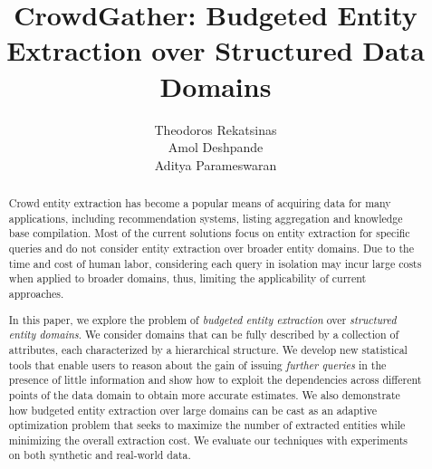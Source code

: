 \documentclass{vldb}
\begin{document}

\title{CrowdGather: Budgeted Entity Extraction over Structured Data Domains}


\author{
	\alignauthor Theodoros Rekatsinas\\
            \alignauthor Amol Deshpande\\
            \alignauthor Aditya Parameswaran \\
}

\maketitle

\begin{abstract}
Crowd entity extraction has become a popular means of acquiring data for many applications, including recommendation systems, listing aggregation and knowledge base compilation.  Most of the current solutions focus on entity extraction for specific queries and do not consider entity extraction over broader entity domains. Due to the time and cost of human labor, considering each query in isolation may incur large costs when applied to broader domains, thus, limiting the applicability of current approaches.
 
In this paper, we explore the problem of {\em budgeted entity extraction} over {\em structured entity domains}. We consider domains that can be fully described by a collection of attributes, each characterized by a hierarchical structure. We develop new statistical tools that enable users to reason about the gain of issuing {\em further queries} in the presence of little information and show how to exploit the dependencies across different points of the data domain to obtain more accurate estimates. We also demonstrate how budgeted entity extraction over large domains can be cast as an adaptive optimization problem that seeks to maximize the number of extracted entities while minimizing the overall extraction cost. We evaluate our techniques with experiments on both synthetic and real-world data. 
\end{abstract}
\end{document}
